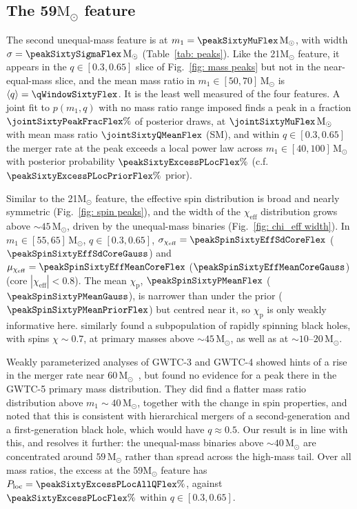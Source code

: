 \documentclass[%
 reprint,
 amsmath,amssymb,
 aps,
 prl,
 nofootinbib,nobibnotes,
]{revtex4-2}
\newcommand{\Msun}{\ensuremath{\mathrm{M}_{\odot}}}
\newcommand{\chieff}{\ensuremath{\chi_{\mathrm{eff}}}}
\newcommand{\chip}{\ensuremath{\chi_{\mathrm{p}}}}
\newcommand{\red}[1]{{\color{Red} #1}}
\newcommand{\featTwenty}{21\xspace}
\newcommand{\featSixty}{59\xspace}
\begin{document}
\subsection{The \featSixty $\Msun$ feature}

The second unequal-mass feature is at $m_1 = \peakSixtyMuFlex\,\Msun$, with width $\sigma = \peakSixtySigmaFlex\,\Msun$ (Table~\ref{tab: peaks}). Like the \featTwenty $\Msun$ feature, it appears in the $q \in [0.3, 0.65]$ slice of Fig.~\ref{fig: mass peaks} but not in the near-equal-mass slice, and the mean mass ratio in $m_1 \in [50, 70]\,\Msun$ is $\langle q \rangle = \qWindowSixtyFlex$. It is the least well measured of the four features. A joint fit to $p(m_1, q)$ with no mass ratio range imposed finds a peak in a fraction $\jointSixtyPeakFracFlex\%$ of posterior draws, at $\jointSixtyMuFlex\,\Msun$ with mean mass ratio $\jointSixtyQMeanFlex$ (SM), and within $q \in [0.3, 0.65]$ the merger rate at the peak exceeds a local power law across $m_1 \in [40, 100]\,\Msun$ with posterior probability $\peakSixtyExcessPLocFlex\%$ (c.f. $\peakSixtyExcessPLocPriorFlex\%$ prior).

Similar to the \featTwenty $\Msun$ feature, the effective spin distribution is broad and nearly symmetric (Fig.~\ref{fig: spin peaks}), and the width of the $\chieff$ distribution grows above $\sim 45\,\Msun$, driven by the unequal-mass binaries (Fig.~\ref{fig: chi_eff width}). \red{In $m_1 \in [55, 65]\,\Msun$, $q \in [0.3, 0.65]$, $\sigma_{\chieff} = \peakSpinSixtyEffSdCoreFlex$ ($\peakSpinSixtyEffSdCoreGauss$) and $\mu_{\chieff} = \peakSpinSixtyEffMeanCoreFlex$ ($\peakSpinSixtyEffMeanCoreGauss$) (core $|\chieff| < 0.8$). The mean $\chip$, $\peakSpinSixtyPMeanFlex$ ($\peakSpinSixtyPMeanGauss$), is narrower than under the prior ($\peakSpinSixtyPMeanPriorFlex$) but centred near it, so $\chip$ is only weakly informative here.} \citet{LIGOScientific:2026ctl} similarly found a subpopulation of rapidly spinning black holes, with spins $\chi \sim 0.7$, at primary masses above $\sim 45\,\Msun$, as well as at $\sim 10$--$20\,\Msun$.

Weakly parameterized analyses of \ac{GWTC-3} and \ac{GWTC-4} showed hints of a rise in the merger rate near $60\,\Msun$~\cite{MaganaHernandez:2024uty, LIGOScientific:2025pvj}, but \citet{LIGOScientific:2026ctl} found no evidence for a peak there in the \ac{GWTC-5} primary mass distribution. They did find a flatter mass ratio distribution above $m_1 \sim 40\,\Msun$, together with the change in spin properties, and noted that this is consistent with hierarchical mergers of a second-generation and a first-generation black hole, which would have $q \approx 0.5$. Our result is in line with this, and resolves it further: the unequal-mass binaries above $\sim 40\,\Msun$ are concentrated around $\featSixty\,\Msun$ rather than spread across the high-mass tail. \red{Over all mass ratios, the excess at the \featSixty $\Msun$ feature has $P_{\rm loc} = \peakSixtyExcessPLocAllQFlex\%$, against $\peakSixtyExcessPLocFlex\%$ within $q \in [0.3, 0.65]$.}
\end{document}
